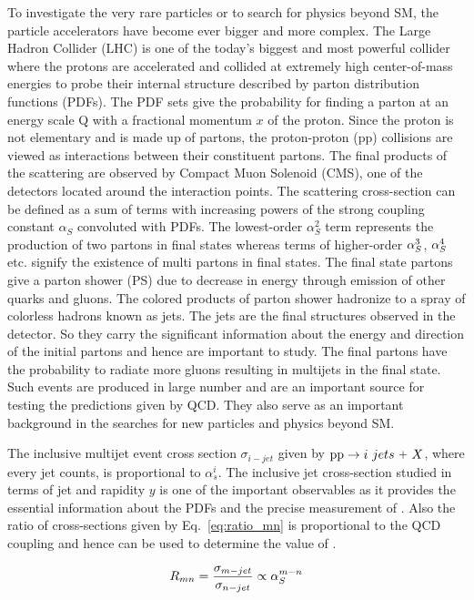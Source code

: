 To investigate the very rare particles or to search for physics beyond SM, the particle accelerators have become ever bigger and more complex. The Large Hadron Collider (LHC) is one of the today's biggest and most powerful collider where the protons are accelerated and collided at extremely high center-of-mass energies to probe their internal structure described by parton distribution functions (PDFs). The PDF sets give the probability for finding a parton at an energy scale Q with a fractional momentum $x$ of the proton. Since the proton is not elementary and is made up of partons, the proton-proton (pp) collisions are viewed as interactions between their constituent partons. The final products of the scattering are observed by Compact Muon Solenoid (CMS), one of the detectors located around the interaction points. The scattering cross-section can be defined as a sum of terms with increasing powers of the strong coupling constant $\alpha_{S}$ convoluted with PDFs. The lowest-order $\alpha_{S}^{2}$ term represents the production of two partons in final states whereas terms of higher-order $\alpha_S^3$, $\alpha_S^4$ etc. signify the existence of multi partons in final states. The final state partons give a parton shower (PS) due to decrease in energy through emission of other quarks and gluons. The colored products of parton shower hadronize to a spray of colorless hadrons known as jets. The jets are the final structures observed in the detector. So they carry the significant information about the energy and direction of the initial partons and hence are important to study. The final partons have the probability to radiate more gluons resulting in multijets in the final state. Such events are produced in large number and are an important source for testing the predictions given by QCD. They also serve as an important background in the searches for new particles and physics beyond SM. 

The inclusive multijet event cross section $\sigma_{i-jet}$ given by ${{\rm pp}\to i~jets~\plus X}$, where every jet counts, is proportional to $\alpha^{i}_{s}$. The inclusive jet cross-section studied in terms of jet \pt and rapidity $y$ is one of the important observables as it provides the essential information about the PDFs and the precise measurement of \alps. Also the ratio of cross-sections given by Eq.~\ref{eq:ratio_mn} is proportional to the QCD coupling \alps and hence can be used to determine the value of \alps. 

\begin{equation}
R_{mn} = \frac{\sigma_{m-jet}}{\sigma_{n-jet}} \propto \alps^{m-n}
\label{eq:ratio_mn}
\end{equation}

